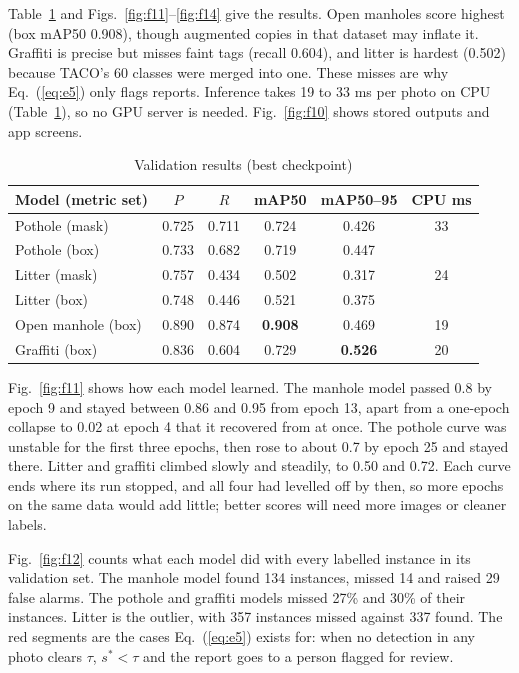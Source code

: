 \documentclass{ieeeaccess}
\begin{document}
Table~\ref{tab:t5} and Figs.~\ref{fig:f11}--\ref{fig:f14} give the results. Open manholes score highest (box mAP50 0.908), though augmented copies in that dataset may inflate it. Graffiti is precise but misses faint tags (recall 0.604), and litter is hardest (0.502) because TACO's 60 classes were merged into one. These misses are why Eq.~(\ref{eq:e5}) only flags reports. Inference takes 19 to 33 ms per photo on CPU (Table~\ref{tab:t5}), so no GPU server is needed. Fig.~\ref{fig:f10} shows stored outputs and app screens.

\begin{table}[!t]
\caption{Validation results (best checkpoint)}
\label{tab:t5}
\centering
\footnotesize
\setlength{\tabcolsep}{3.4pt}
\begin{tabular}{@{}lccccc@{}}
\toprule
Model (metric set) & $P$ & $R$ & mAP50 & mAP50--95 & CPU ms\\
\midrule
Pothole (mask) & 0.725 & 0.711 & 0.724 & 0.426 & 33\\
Pothole (box) & 0.733 & 0.682 & 0.719 & 0.447 & \\
Litter (mask) & 0.757 & 0.434 & 0.502 & 0.317 & 24\\
Litter (box) & 0.748 & 0.446 & 0.521 & 0.375 & \\
Open manhole (box) & 0.890 & 0.874 & \textbf{0.908} & 0.469 & 19\\
Graffiti (box) & 0.836 & 0.604 & 0.729 & \textbf{0.526} & 20\\
\bottomrule
\end{tabular}
\end{table}

Fig.~\ref{fig:f11} shows how each model learned. The manhole model passed 0.8 by epoch 9 and stayed between 0.86 and 0.95 from epoch 13, apart from a one-epoch collapse to 0.02 at epoch 4 that it recovered from at once. The pothole curve was unstable for the first three epochs, then rose to about 0.7 by epoch 25 and stayed there. Litter and graffiti climbed slowly and steadily, to 0.50 and 0.72. Each curve ends where its run stopped, and all four had levelled off by then, so more epochs on the same data would add little; better scores will need more images or cleaner labels.

Fig.~\ref{fig:f12} counts what each model did with every labelled instance in its validation set. The manhole model found 134 instances, missed 14 and raised 29 false alarms. The pothole and graffiti models missed 27\% and 30\% of their instances. Litter is the outlier, with 357 instances missed against 337 found. The red segments are the cases Eq.~(\ref{eq:e5}) exists for: when no detection in any photo clears $\tau$, $s^{*}<\tau$ and the report goes to a person flagged for review.
\end{document}
